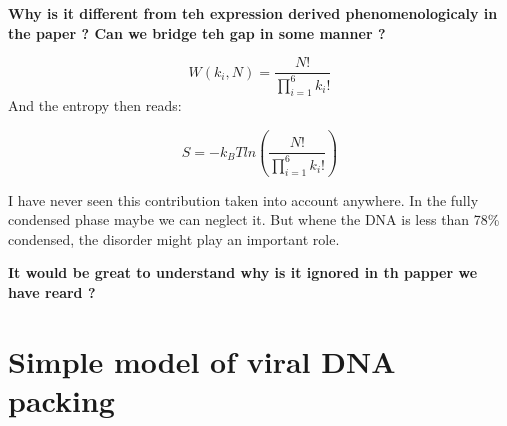 \documentclass{article}
\begin{document}
\textbf{Why is it different from teh expression derived phenomenologicaly in the paper ? Can we bridge teh gap in some manner ?}

\begin{equation}
    W({k_i},N) = \frac{N!}{\prod_{i=1}^6 k_i!}
\end{equation}
And the entropy then reads:

\begin{equation}
     S = - k_B T ln \left( \frac{N!}{\prod_{i=1}^6 k_i!} \right)
\end{equation}

I have never seen this contribution taken into account anywhere. In the fully condensed phase maybe we can neglect it. But whene the DNA is less than 78\% condensed, the disorder might play an important role.

\textbf{It would be great to understand why is it ignored in th papper we have reard ?}

\section{Simple model of viral DNA packing}


\printbibliography[
    heading=bibintoc,
    title={References} ]
\end{document}
